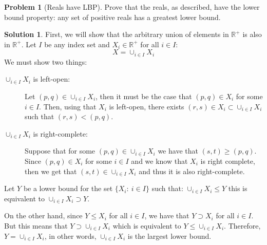 \documentclass{article}
\theoremstyle{definition}
\newtheorem*{soln}{Solution}
\newtheorem*{prob}{Problem}
\theoremstyle{theorem}
\newcommand{\R}{\mathbb{R}}
\begin{document}
\begin{prob}[Reals have LBP]
Prove that the reals, as described, have the lower bound property: any set of positive reals has a greatest lower bound.
\end{prob}
\begin{soln}
	First, we will show that the arbitrary union of  elements in $\R^+$ is also in $\R^+$. Let $I$ be any index set and $ X_i\in \R^+$ for all $i\in I$:
	$$ X = \cup_{i\in I} X_i $$
	We must show two things:
	\begin{description}
		\item[$\cup_{i\in I} X_i$ is left-open: ] Let $(p,q) \in \cup_{i\in I} X_i $, then it must be the case that $(p,q)\in X_i$ for some $i \in I$. Then, using that $X_i$ is left-open, there exists $(r,s) \in X_i \subset \cup_{i\in I} X_i$ such that $(r,s)<(p,q)$.  
		\item[$\cup_{i\in I} X_i$ is right-complete:] Suppose that for some $(p,q) \in \cup_{i\in I} X_i$ we have that $(s,t)\geq (p,q)$. Since $(p,q)\in X_i$ for some $i\in I$ and we know that $X_i$ is right complete, then we get that $(s,t)\in \cup_{i\in I} X_i$ and thus it is also right-complete.
	\end{description}
	Let $Y$ be a lower bound for the set $\{ X_i :\ i\in I\}$ such that:
	$\cup_{i\in I} X_i \leq Y$ this is equivalent to $\cup_{i\in I} X_i \supset Y$.

	On the other hand, since $Y\leq X_i$ for all $i\in I$, we have that $Y\supset X_i$ for all $i\in I$. But this means that $Y\supset \cup_{i\in I} X_i$ which is equivalent to $Y\leq \cup_{i\in I} X_i$. Therefore, $Y= \cup_{i\in I} X_i$, in other words, $\cup_{i\in I} X_i$ is the largest lower bound.
\end{soln}
\vspace{1in}
\end{document}
